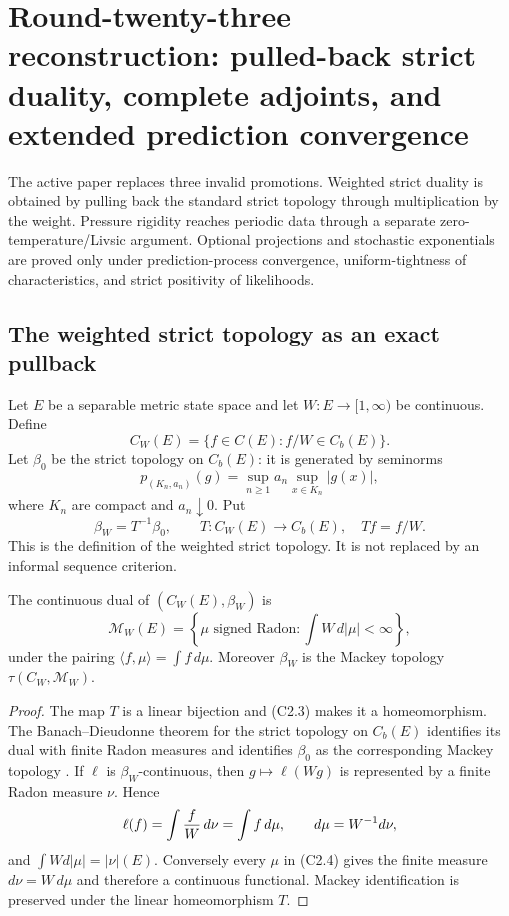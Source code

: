 \section{Round-twenty-three reconstruction: pulled-back strict duality, complete adjoints, and extended prediction convergence}
\label{sec:r23-c2}

The active paper replaces three invalid promotions.  Weighted strict duality
is obtained by pulling back the standard strict topology through multiplication
by the weight.  Pressure rigidity reaches periodic data through a separate
zero-temperature/Livsic argument.  Optional projections and stochastic
exponentials are proved only under prediction-process convergence,
uniform-tightness of characteristics, and strict positivity of likelihoods.

\subsection{The weighted strict topology as an exact pullback}

Let $E$ be a separable metric state space and let
$W:E\to[1,\infty)$ be continuous.  Define
\[
 C_W(E)=\{f\in C(E):f/W\in C_b(E)\}.                      \tag{C2.1}
\]
Let $\beta_0$ be the strict topology on $C_b(E)$: it is generated by
seminorms
\[
 p_{(K_n,a_n)}(g)=\sup_{n\ge1}a_n\sup_{x\in K_n}|g(x)|,  \tag{C2.2}
\]
where $K_n$ are compact and $a_n\downarrow0$.  Put
\[
 \beta_W=T^{-1}\beta_0,
 \qquad T:C_W(E)\to C_b(E),\quad Tf=f/W.                 \tag{C2.3}
\]
This is the definition of the weighted strict topology.  It is not replaced
by an informal sequence criterion.

\begin{theorem}
\label{thm:r23-c2-dual}
The continuous dual of $(C_W(E),\beta_W)$ is
\[
 \mathcal M_W(E)=\left\{\mu\text{ signed Radon}:
             \int W\,d|\mu|<\infty\right\},             \tag{C2.4}
\]
under the pairing $\langle f,\mu\rangle=\int f\,d\mu$.
Moreover $\beta_W$ is the Mackey topology
$\tau(C_W,\mathcal M_W)$.
\end{theorem}

\begin{proof}
The map $T$ is a linear bijection and (C2.3) makes it a homeomorphism.  The
Banach--Dieudonne theorem for the strict topology on $C_b(E)$ identifies its
dual with finite Radon measures and identifies $\beta_0$ as the corresponding
Mackey topology \cite{Kraaij2016}.  If $\ell$ is $\beta_W$-continuous, then
$g\mapsto\ell(Wg)$ is represented by a finite Radon measure $\nu$.  Hence
\[
 \ell(f)=\int {f\over W}\,d\nu=\int f\,d\mu,
 \qquad d\mu=W^{-1}d\nu,
\]
and $\int Wd|\mu|=|\nu|(E)$.  Conversely every $\mu$ in (C2.4) gives the
finite measure $d\nu=W\,d\mu$ and therefore a continuous functional.  Mackey
identification is preserved under the linear homeomorphism $T$.
\end{proof}

